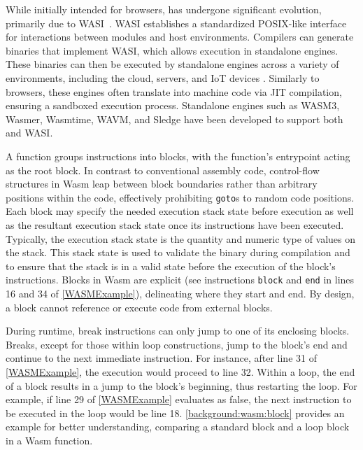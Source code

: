 While initially intended for browsers, \Wasm has undergone significant evolution, primarily due to WASI~\cite{WASI}.
WASI establishes a standardized POSIX-like interface for interactions between \Wasm modules and host environments.
Compilers can generate \Wasm binaries that implement WASI, which allows execution in standalone engines.
These binaries can then be executed by standalone engines across a variety of environments, including the cloud, servers, and IoT devices \cite{makitalo2021webassembly, 2023arXiv230513241T}.
Similarly to browsers, these engines often translate \Wasm into machine code via JIT compilation, ensuring a sandboxed execution process.
Standalone engines such as WASM3, Wasmer, Wasmtime, WAVM, and Sledge \cite{Sledge} have been developed to support both \Wasm and WASI.


\label{wasm:control_flow}


A \Wasm function groups instructions into blocks, with the function's entrypoint acting as the root block. 
In contrast to conventional assembly code, control-flow structures in Wasm leap between block boundaries rather than arbitrary positions within the code, effectively prohibiting \texttt{goto}s to random code positions. 
Each block may specify the needed execution stack state before execution as well as the resultant execution stack state once its instructions have been executed.
Typically, the execution stack state is the quantity and numeric type of values on the stack. 
This stack state is used to validate the binary during compilation and to ensure that the stack is in a valid state before the execution of the block's instructions.
Blocks in Wasm are explicit (see instructions \texttt{block} and \texttt{end} in lines 16 and 34 of \autoref{WASMExample}), delineating where they start and end.
By design, a block cannot reference or execute code from external blocks.


During runtime, \Wasm break instructions can only jump to one of its enclosing blocks. 
Breaks, except for those within loop constructions, jump to the block's end and continue to the next immediate instruction. 
For instance, after line 31 of \autoref{WASMExample}, the execution would proceed to line 32. 
Within a loop, the end of a block results in a jump to the block's beginning, thus restarting the loop. 
For example, if line 29 of \autoref{WASMExample} evaluates as false, the next instruction to be executed in the loop would be line 18. 
\autoref{background:wasm:block} provides an example for better understanding, comparing a standard block and a loop block in a Wasm function.

